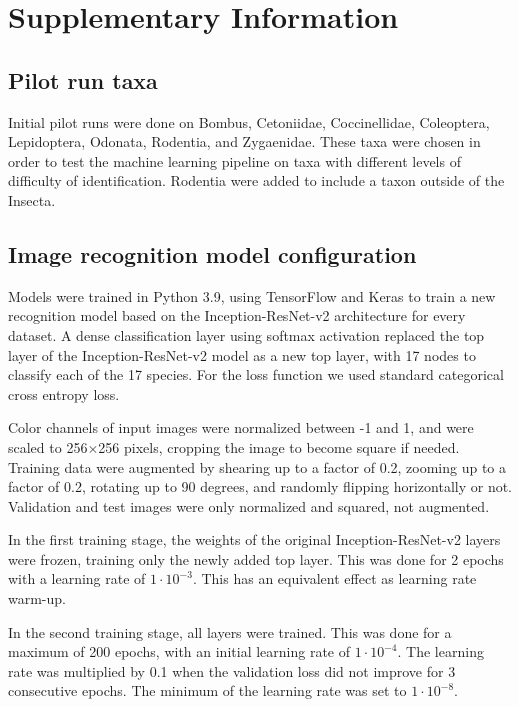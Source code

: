 \documentclass{article}
\begin{document}
\section*{Supplementary Information}

\subsection*{Pilot run taxa}
Initial pilot runs were done on Bombus, Cetoniidae, Coccinellidae, Coleoptera, Lepidoptera, Odonata, Rodentia, and Zygaenidae. These taxa were chosen in order to test the machine learning pipeline on taxa with different levels of difficulty of identification. Rodentia were added to include a taxon outside of the Insecta.

\subsection*{Image recognition model configuration}
\label{sec:model}
Models were trained in Python 3.9\autocite{python}, using TensorFlow\autocite{tensorflow} and Keras\autocite{keras} to train a new recognition model based on the Inception-ResNet-v2 architecture\autocite{szegedy2016inceptionv4} for every dataset. A dense classification layer using softmax activation replaced the top layer of the Inception-ResNet-v2 model as a new top layer, with 17 nodes to classify each of the 17 species. For the loss function we used standard categorical cross entropy loss.

Color channels of input images were normalized between -1 and 1, and were scaled to 256\(\times\)256 pixels, cropping the image to become square if needed. Training data were augmented by shearing up to a factor of 0.2, zooming up to a factor of 0.2, rotating up to 90 degrees, and randomly flipping horizontally or not. Validation and test images were only normalized and squared, not augmented.

In the first training stage, the weights of the original Inception-ResNet-v2 layers were frozen, training only the newly added top layer. This was done for 2 epochs with a learning rate of \(1\cdot10^{-3}\). This has an equivalent effect as learning rate warm-up.

In the second training stage, all layers were trained. This was done for a maximum of 200 epochs, with an initial learning rate of \(1\cdot10^{-4}\). The learning rate was multiplied by 0.1 when the validation loss did not improve for 3 consecutive epochs. The minimum of the learning rate was set to \(1\cdot10^{-8}\).
\end{document}
